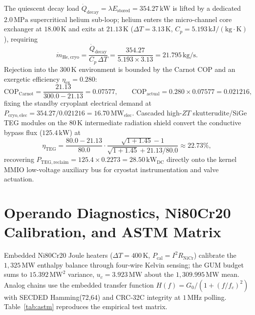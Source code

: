 \documentclass[10pt,journal,compsoc]{IEEEtran}
\begin{document}
The quiescent decay load $\dot{Q}_{\mathrm{decay}} = \lambda
E_{\mathrm{stored}} = 354.27\,\mathrm{kW}$ is lifted by a dedicated
$2.0\,\mathrm{MPa}$ supercritical helium sub-loop; helium enters the
micro-channel core exchanger at $18.00\,\mathrm{K}$ and exits at
$21.13\,\mathrm{K}$ ($\Delta T = 3.13\,\mathrm{K}$, $C_p =
5.193\,\mathrm{kJ/(kg\cdot K)}$), requiring
\begin{equation}
\dot{m}_{\mathrm{He,cryo}} = \frac{\dot{Q}_{\mathrm{decay}}}{C_p\,
\Delta T} = \frac{354.27}{5.193 \times 3.13} = 21.795\,\mathrm{kg/s}.
\end{equation}
Rejection into the $300\,\mathrm{K}$ environment is bounded by the Carnot
COP and an exergetic efficiency $\eta_{\mathrm{ex}} = 0.280$:
\begin{equation}
\mathrm{COP}_{\mathrm{Carnot}} = \frac{21.13}{300.0 - 21.13} = 0.07577,
\qquad
\mathrm{COP}_{\mathrm{actual}} = 0.280 \times 0.07577 = 0.021216,
\end{equation}
fixing the standby cryoplant electrical demand at
$P_{\mathrm{cryo,elec}} = 354.27/0.021216 = 16.70\,\mathrm{MW_{elec}}$.
Cascaded high-$ZT$ skutterudite/SiGe TEG modules on the $80\,\mathrm{K}$
intermediate radiation shield convert the conductive bypass flux
($125.4\,\mathrm{kW}$) at
\begin{equation}
\eta_{\mathrm{TEG}} = \frac{80.0 - 21.13}{80.0} \cdot
\frac{\sqrt{1 + 1.45} - 1}{\sqrt{1 + 1.45} + 21.13/80.0} \approx 22.73\%,
\end{equation}
recovering $P_{\mathrm{TEG,reclaim}} = 125.4 \times 0.2273 =
28.50\,\mathrm{kW_{DC}}$ directly onto the kernel MMIO low-voltage
auxiliary bus for cryostat instrumentation and valve actuation.

\section{Operando Diagnostics, Ni80Cr20 Calibration, and ASTM Matrix}
\label{app:diagnostics}
Embedded Ni80Cr20 Joule heaters ($\Delta T = 400\,\mathrm{K}$,
$P_{\mathrm{cal}} = I^2R_{\mathrm{NiCr}}$) calibrate the $1{,}325\,
\mathrm{MW}$ enthalpy balance through four-wire Kelvin sensing; the
GUM budget sums to $15.392\,\mathrm{MW^2}$ variance, $u_c = 3.923\,
\mathrm{MW}$ about the $1{,}309.995\,\mathrm{MW}$ mean. Analog chains
use the embedded transfer function $H(f) = G_0/(1+(f/f_c)^2)$ with
SECDED Hamming(72,64) and CRC-32C integrity at $1\,\mathrm{MHz}$
polling. Table~\ref{tab:astm} reproduces the empirical test matrix.
\end{document}
